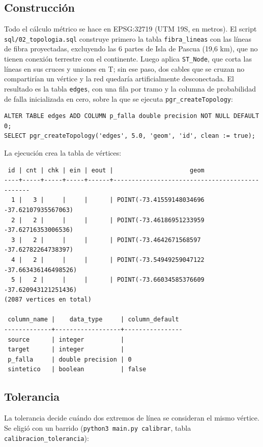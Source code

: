 \documentclass[11pt,a4paper]{article}
\newcommand{\cod}[1]{\texttt{#1}}
\begin{document}
\subsection{Construcción}
Todo el cálculo métrico se hace en EPSG:32719 (UTM 19S, en metros). El script
\cod{sql/02\_topologia.sql} construye primero la tabla \cod{fibra\_lineas} con las líneas de fibra
proyectadas, excluyendo las 6 partes de Isla de Pascua (19,6 km), que no tienen conexión terrestre con
el continente. Luego aplica \cod{ST\_Node}, que corta las líneas en sus cruces y uniones en T; sin ese
paso, dos cables que se cruzan no compartirían un vértice y la red quedaría artificialmente
desconectada. El resultado es la tabla \cod{edges}, con una fila por tramo y la columna de probabilidad
de falla inicializada en cero, sobre la que se ejecuta \cod{pgr\_createTopology}:

\begin{Verbatim}
ALTER TABLE edges ADD COLUMN p_falla double precision NOT NULL DEFAULT 0;
SELECT pgr_createTopology('edges', 5.0, 'geom', 'id', clean := true);
\end{Verbatim}

La ejecución crea la tabla de vértices:

\begin{Verbatim}
 id | cnt | chk | ein | eout |                     geom
----+-----+-----+-----+------+-----------------------------------------------
  1 |   3 |     |     |      | POINT(-73.41559148034696 -37.62107935567063)
  2 |   2 |     |     |      | POINT(-73.46186951233959 -37.62716353006536)
  3 |   2 |     |     |      | POINT(-73.4642671568597 -37.62782264738397)
  4 |   2 |     |     |      | POINT(-73.54949259047122 -37.663436146498526)
  5 |   2 |     |     |      | POINT(-73.66034585376609 -37.620943121251436)
(2087 vertices en total)

 column_name |    data_type     | column_default
-------------+------------------+----------------
 source      | integer          |
 target      | integer          |
 p_falla     | double precision | 0
 sintetico   | boolean          | false
\end{Verbatim}

\subsection{Tolerancia}
La tolerancia decide cuándo dos extremos de línea se consideran el mismo vértice. Se eligió con un
barrido (\cod{python3 main.py calibrar}, tabla \cod{calibracion\_tolerancia}):
\end{document}
